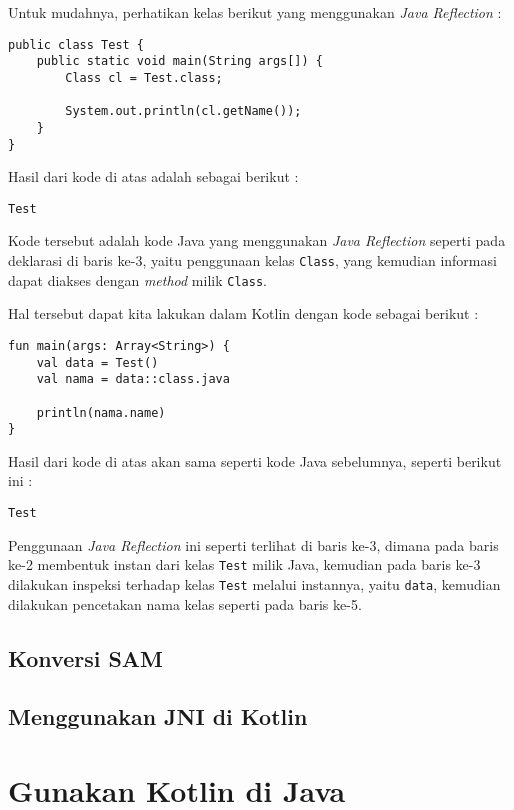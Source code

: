 Untuk mudahnya, perhatikan kelas berikut yang menggunakan \textit{Java Reflection} :

\begin{lstlisting}
public class Test {
	public static void main(String args[]) {
		Class cl = Test.class;
		
		System.out.println(cl.getName());
	}
}
\end{lstlisting}

Hasil dari kode di atas adalah sebagai berikut :

\begin{lstlisting}
Test
\end{lstlisting}

Kode tersebut adalah kode Java yang menggunakan \textit{Java Reflection} seperti pada deklarasi di baris ke-3, yaitu penggunaan kelas \texttt{Class}, yang kemudian informasi dapat diakses dengan \textit{method} milik \texttt{Class}.

Hal tersebut dapat kita lakukan dalam Kotlin dengan kode sebagai berikut :

\begin{lstlisting}
fun main(args: Array<String>) {
	val data = Test()
	val nama = data::class.java
	
	println(nama.name)
}
\end{lstlisting}

Hasil dari kode di atas akan sama seperti kode Java sebelumnya, seperti berikut ini :

\begin{lstlisting}
Test
\end{lstlisting}

Penggunaan \textit{Java Reflection} ini seperti terlihat di baris ke-3, dimana pada baris ke-2 membentuk instan dari kelas \texttt{Test} milik Java, kemudian pada baris ke-3 dilakukan inspeksi terhadap kelas \texttt{Test} melalui instannya, yaitu \texttt{data}, kemudian dilakukan pencetakan nama kelas seperti pada baris ke-5.

\subsection{Konversi SAM}

\subsection{Menggunakan JNI di Kotlin}

\section{Gunakan Kotlin di Java}